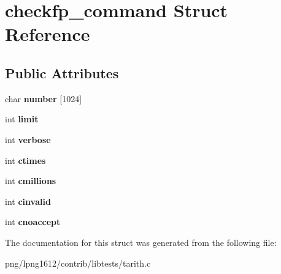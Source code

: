 \hypertarget{structcheckfp__command}{\section{checkfp\+\_\+command Struct Reference}
\label{structcheckfp__command}
}
\subsection*{Public Attributes}
\begin{DoxyCompactItemize}
\item 
\hypertarget{structcheckfp__command_a210dd8db7c7ee56e6c928296ad63c275}{char {\bfseries number} \mbox{[}1024\mbox{]}}\label{structcheckfp__command_a210dd8db7c7ee56e6c928296ad63c275}

\item 
\hypertarget{structcheckfp__command_a9d975a2bb5e346987e0a5570ccc43cbb}{int {\bfseries limit}}\label{structcheckfp__command_a9d975a2bb5e346987e0a5570ccc43cbb}

\item 
\hypertarget{structcheckfp__command_aaccead191ad45a5c366bf72b0c5597c7}{int {\bfseries verbose}}\label{structcheckfp__command_aaccead191ad45a5c366bf72b0c5597c7}

\item 
\hypertarget{structcheckfp__command_a76a6aa166002ec7949b8df482e0b9fcc}{int {\bfseries ctimes}}\label{structcheckfp__command_a76a6aa166002ec7949b8df482e0b9fcc}

\item 
\hypertarget{structcheckfp__command_abeea9c1aff448f84ba2bfae4beb66d36}{int {\bfseries cmillions}}\label{structcheckfp__command_abeea9c1aff448f84ba2bfae4beb66d36}

\item 
\hypertarget{structcheckfp__command_a331e4f1e223272c800baa3a3b452c7a6}{int {\bfseries cinvalid}}\label{structcheckfp__command_a331e4f1e223272c800baa3a3b452c7a6}

\item 
\hypertarget{structcheckfp__command_a1c0948b681c3639b2ea9e72dc6561059}{int {\bfseries cnoaccept}}\label{structcheckfp__command_a1c0948b681c3639b2ea9e72dc6561059}

\end{DoxyCompactItemize}


The documentation for this struct was generated from the following file\+:\begin{DoxyCompactItemize}
\item 
png/lpng1612/contrib/libtests/tarith.\+c\end{DoxyCompactItemize}
